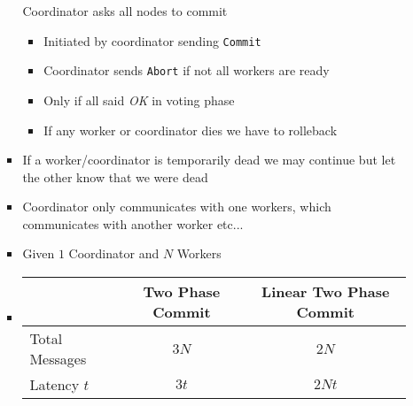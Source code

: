 \begin{itemize}
\begin{itemize}
\begin{itemize}
                     Coordinator asks all nodes to commit
                        \begin{itemize}
                            \item Initiated by coordinator sending \verb+Commit+
                            \item Coordinator sends \verb+Abort+ if not all workers are ready
                            \item Only if all said \textit{OK} in voting phase
                            \item If any worker or coordinator dies we have to rolleback
                        \end{itemize}
                    \item If a worker/coordinator is temporarily dead we may continue but let the other know that we were dead
                \end{itemize}
                \begin{itemize}
                    \item Coordinator only communicates with one workers, which communicates with another worker etc...
                \end{itemize}
                \begin{itemize}
                    \item Given $1$ Coordinator and $N$ Workers
                    \item 
\begin{tabular}{l | c | c}
    & Two Phase Commit & Linear Two Phase Commit\\\hline
    Total Messages & $3N$ & $2N$\\
    Latency $t$ & $3t$ & $2Nt$


\end{tabular}
\end{itemize}
\end{itemize}
\end{itemize}
